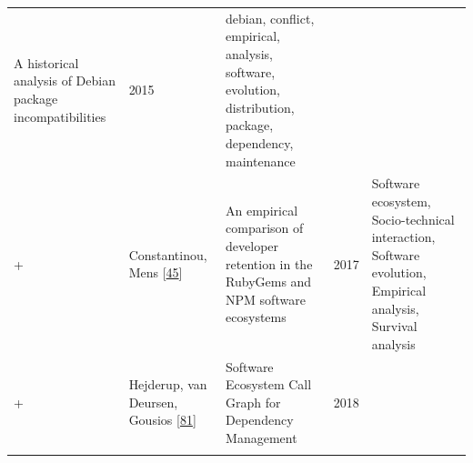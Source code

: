 \documentclass[]{book}
\begin{document}
\begin{longtable}[]{@{}lllll@{}}
\begin{minipage}[t]{0.34\columnwidth}
A historical analysis of Debian package incompatibilities\strut
\end{minipage} & \begin{minipage}[t]{0.02\columnwidth}\raggedright\strut
2015\strut
\end{minipage} & \begin{minipage}[t]{0.39\columnwidth}\raggedright\strut
debian, conflict, empirical, analysis, software, evolution,
distribution, package, dependency, maintenance\strut
\end{minipage}\tabularnewline
\begin{minipage}[t]{0.01\columnwidth}\raggedright\strut
+\strut
\end{minipage} & \begin{minipage}[t]{0.09\columnwidth}\raggedright\strut
Constantinou, Mens
{[}\protect\hyperlink{ref-Constantinou2017}{45}{]}\strut
\end{minipage} & \begin{minipage}[t]{0.34\columnwidth}\raggedright\strut
An empirical comparison of developer retention in the RubyGems and NPM
software ecosystems\strut
\end{minipage} & \begin{minipage}[t]{0.02\columnwidth}\raggedright\strut
2017\strut
\end{minipage} & \begin{minipage}[t]{0.39\columnwidth}\raggedright\strut
Software ecosystem, Socio-technical interaction, Software evolution,
Empirical analysis, Survival analysis\strut
\end{minipage}\tabularnewline
\begin{minipage}[t]{0.01\columnwidth}\raggedright\strut
+\strut
\end{minipage} & \begin{minipage}[t]{0.09\columnwidth}\raggedright\strut
Hejderup, van Deursen, Gousios
{[}\protect\hyperlink{ref-Hejderup2018}{81}{]}\strut
\end{minipage} & \begin{minipage}[t]{0.34\columnwidth}\raggedright\strut
Software Ecosystem Call Graph for Dependency Management\strut
\end{minipage} & \begin{minipage}[t]{0.02\columnwidth}\raggedright\strut
2018\strut
\end{minipage} & \begin{minipage}[t]{0.39\columnwidth}\raggedright\strut
\strut
\end{minipage}\tabularnewline
\begin{minipage}[t]{0.01\columnwidth}\raggedright\strut

\end{minipage}
\end{longtable}
\end{document}
